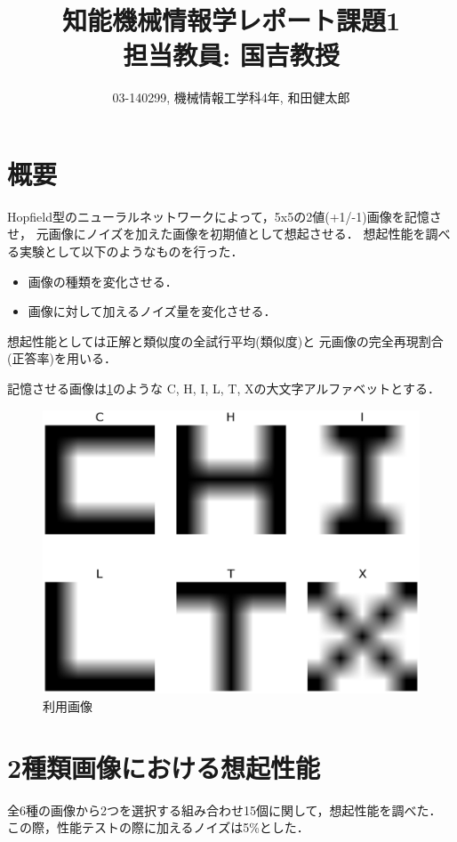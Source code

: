 \documentclass[10pt,twocolumn]{jarticle}
\title{知能機械情報学レポート課題1 \\ \large{担当教員: 国吉教授}}
\author{03-140299, 機械情報工学科4年, 和田健太郎}
\newcommand{\figref}[1]{\figurename\ref{fig:#1}}
\begin{document}
\maketitle


\section{概要}
Hopfield型のニューラルネットワークによって，5x5の2値(+1/-1)画像を記憶させ，
元画像にノイズを加えた画像を初期値として想起させる．
想起性能を調べる実験として以下のようなものを行った．
\begin{itemize}
  \item 画像の種類を変化させる．
  \item 画像に対して加えるノイズ量を変化させる．
\end{itemize}

想起性能としては正解と類似度の全試行平均(類似度)と
元画像の完全再現割合(正答率)を用いる．

記憶させる画像は\figref{original-images}のような
C, H, I, L, T, Xの大文字アルファベットとする．
\begin{figure}[htbp]
  \centering
    \includegraphics[width=\columnwidth]{figs/alphabet_images}
    \caption{利用画像}
  \label{fig:original-images}
\end{figure}


\section{2種類画像における想起性能}\label{sec:two-label-performance}
全6種の画像から2つを選択する組み合わせ15個に関して，想起性能を調べた．
この際，性能テストの際に加えるノイズは5\%とした．
\end{document}
